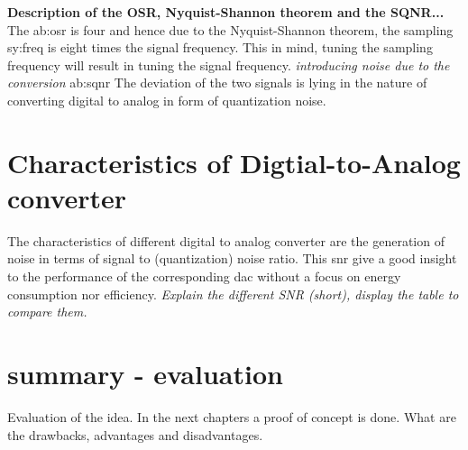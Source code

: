 \textbf{Description of the OSR, Nyquist-Shannon theorem and the SQNR...}
The \gls{ab:osr} is four and hence due to the Nyquist-Shannon theorem, the sampling \gls{sy:freq} is eight times the signal frequency.
This in mind, tuning the sampling frequency will result in tuning the signal frequency.
\textit{introducing noise due to the conversion}
\gls{ab:sqnr}
The deviation of the two signals is lying in the nature of converting digital to analog in form of quantization noise.

\section{Characteristics of Digtial-to-Analog converter}
\label{ch:characteristics}
The characteristics of different digital to analog converter are the generation of noise in terms of signal to (quantization) noise ratio.
This snr give a good insight to the performance of the corresponding dac without a focus on energy consumption nor efficiency.
\textit{Explain the different SNR (short), display the table to compare them.}


\section{summary - evaluation}
Evaluation of the idea. In the next chapters a proof of concept is done. What are the drawbacks, advantages and disadvantages.
